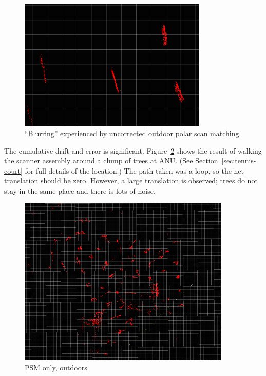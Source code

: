 \documentclass[12pt,oneside,a4paper]{book}
\begin{document}
\begin{figure}[h!]
  \centering
  \includegraphics[width=0.8\textwidth]{figs/blurring}
  \caption{``Blurring'' experienced by uncorrected outdoor polar scan matching.}
  \label{fig:blur-detailed}
\end{figure}

The cumulative drift and error is
significant. Figure~\ref{fig:psm-outdoor} shows the result of walking
the scanner assembly around a clump of trees at ANU. (See
Section~\ref{sec:tennis-court} for full details of the location.) The
path taken was a loop, so the net translation should be zero. However, a
large translation is observed; trees do not stay in the same place and
there is lots of noise.

\begin{figure}[h!]
  \centering
  \includegraphics[width=0.9\textwidth]{figs/psm-outdoor}
  \caption{PSM only, outdoors}
  \label{fig:psm-outdoor}
\end{figure}
\end{document}
